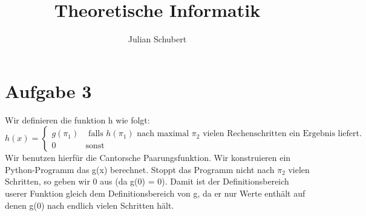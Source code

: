 \documentclass[14pt]{article}
\title{Theoretische Informatik}
\author{Julian Schubert}
\begin{document}
\section*{Aufgabe 3}
Wir definieren die funktion h wie folgt:
\begin{equation*}
    h(x) =
    \begin{cases}
        g(\pi_1)                 & \text{ falls $h(\pi_1)$ nach maximal
        $\pi_2$ vielen Rechenschritten ein Ergebnis liefert.}             \\
        0                   & \text{sonst}
    \end{cases}
\end{equation*}
Wir benutzen hierfür die Cantorsche Paarungsfunktion. Wir konstruieren
ein Python-Programm das g(x) berechnet. Stoppt das Programm nicht nach
$\pi_2$ vielen Schritten, so geben wir 0 aus (da g(0)  = 0). Damit ist
der Definitionsbereich userer Funktion gleich dem Definitionsbereich von
g, da er nur Werte enthält auf denen g(0) nach endlich vielen Schritten
hält.
\end{document}
